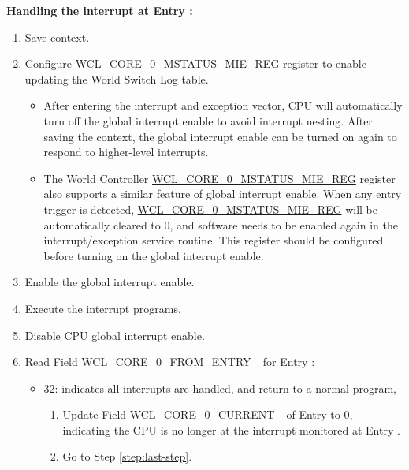\documentclass[main\_\_EN.tex]{subfiles}
\begin{document}
\textbf{Handling the interrupt at Entry : \label{step:wctrl-start-interrput}}
    \begin{enumerate}
        \item Save context.
        \item Configure \hyperref[regdesc:WCLCORE0MSTATUSMIEREG]{WCL\_CORE\_0\_MSTATUS\_MIE\_REG} register to enable updating the World Switch Log table.
        \begin{itemize}
            \item After entering the interrupt and exception vector, CPU will automatically turn off the global interrupt enable to avoid interrupt nesting. After saving the context, the global interrupt enable can be turned on again to respond to higher-level interrupts. 
            \item The World Controller \hyperref[regdesc:WCLCORE0MSTATUSMIEREG]{WCL\_CORE\_0\_MSTATUS\_MIE\_REG} register also supports a similar feature of global interrupt enable. When any entry trigger is detected, \hyperref[regdesc:WCLCORE0MSTATUSMIEREG]{WCL\_CORE\_0\_MSTATUS\_MIE\_REG} will be automatically cleared to 0, and software needs to be enabled again in the interrupt/exception service routine. This register should be configured before turning on the global interrupt enable.
        \end{itemize}
        \item Enable the global interrupt enable.
        \item Execute the interrupt programs. \label{step:interrupt-process-normal}
        \item Disable CPU global interrupt enable.
        \item Read Field \hyperref[fielddesc:WCLCORE0FROMENTRY0]{WCL\_CORE\_0\_FROM\_ENTRY\_} for Entry :\label{step:interrupt_process_update}
            \begin{itemize}
                \item 32: indicates all interrupts are handled, and return to a normal program,
                \begin{enumerate}
                    \item Update Field \hyperref[fielddesc:WCLCORE0CURRENT0]{WCL\_CORE\_0\_CURRENT\_} of Entry  to 0, indicating the CPU is no longer at the interrupt monitored at Entry .
                    \item Go to Step \ref{step:last-step}.
                \end{enumerate}

\end{itemize}
\end{enumerate}
\end{document}
